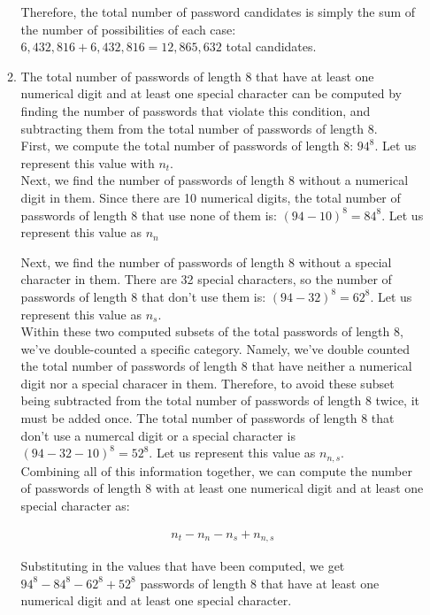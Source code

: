 \documentclass[11pt]{article}
\theoremstyle{definition}
\begin{document}
\begin{enumerate}
\begin{enumerate}
Therefore, the total number of password candidates is simply the sum of the number of possibilities of each case: $6,432,816 + 6,432,816 = 12,865,632$ total candidates.\\

\item The total number of passwords of length 8 that have at least one numerical digit and at least one special character can be computed by finding the number of passwords that
violate this condition, and subtracting them from the total number of passwords of length 8.\\ 

First, we compute the total number of passwords of length 8: $94^8$. Let us represent this value with $n_t$.\\

Next, we find the number of passwords of length 8 without a numerical digit in them. Since there are 10 numerical digits, the total number of passwords of length 8 that use none of them is:
$(94-10)^8 = 84^8$. Let us represent this value as $n_n$

Next, we find the number of passwords of length 8 without a special character in them. There are 32 special characters, so the number of passwords of length 8 
that don't use them is: $(94-32)^8 = 62^8$. Let us represent this value as $n_s$.\\

Within these two computed subsets of the total passwords of length 8, we've double-counted a specific category. 
Namely, we've double counted the total number of passwords of length 8 that have neither a numerical digit nor a special characer in them. 
Therefore, to avoid these subset being subtracted from the total number of passwords of length 8 twice, it must be added once. The total number of passwords of 
length 8 that don't use a numercal digit or a special character is $(94 - 32 - 10)^8 = 52^8$. Let us represent this value as $n_{n,s}$.\\ 

Combining all of this information together, we can compute the number of passwords of length 8 with at least one numerical digit and at least one special character as:

\begin{align*}
n_t - n_n - n_s + n_{n,s}
\end{align*}

Substituting in the values that have been computed, we get $94^8 - 84^8 - 62^8 + 52^8$ passwords of length 8 that have at least one numerical digit and at least one special character.\\


\end{enumerate}
\end{enumerate}
\end{document}
